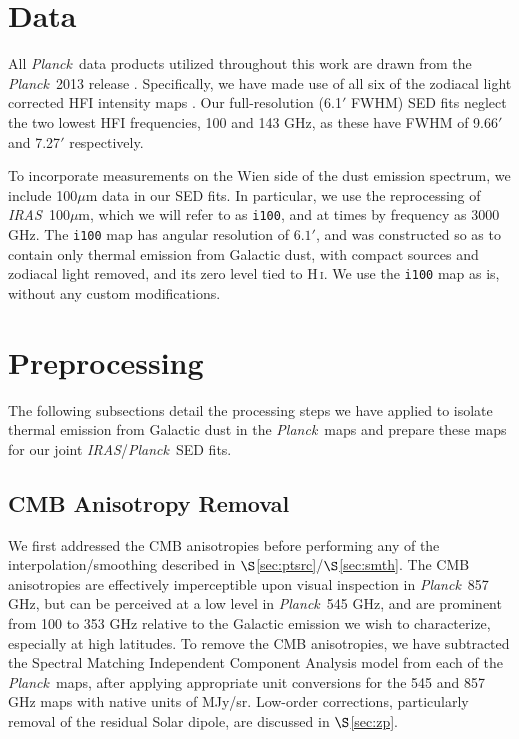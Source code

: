 \documentclass{emulateapj}
\newcommand{\IRAS}{{\it IRAS}}
\newcommand{\PLANCK}{{\it Planck}}
\begin{document}
\section{Data}
\label{sec:data}
All \PLANCK~data products utilized throughout this work are drawn from the 
\PLANCK~2013 release \citep{planck2013}. Specifically, we have made use 
of all six of the zodiacal light corrected HFI intensity maps
\citep[\texttt{R1.10\_nominal\_ZodiCorrected},][]{planckzodi}. Our 
full-resolution (6.1$'$ FWHM) SED fits neglect the two lowest HFI frequencies, 
100 and 143 GHz, as these have FWHM of 9.66$'$ and 7.27$'$ respectively.

To incorporate measurements on the Wien side of the dust emission spectrum, 
we include 100$\mu$m data in our SED fits. In particular, we use the 
\citet[henceforth SFD]{SFD} reprocessing of \IRAS~100$\mu$m, which we will 
refer to as \verb|i100|, and at times by frequency as 3000 GHz. The \verb|i100|
 map has angular resolution of $6.1'$, and was constructed so as to contain 
only thermal emission from Galactic dust, with compact sources and zodiacal 
light removed, and its zero level tied to H\,\textsc{i}. We use the \verb|i100|
map as is, without any custom modifications.


\section{Preprocessing}
\label{sec:prepro}

The following subsections detail the processing steps we have applied to 
isolate thermal emission from Galactic dust in the \PLANCK~maps and prepare
these maps for our joint \IRAS/\PLANCK~SED fits.

\subsection{CMB Anisotropy Removal}
\label{sec:cmb}
We first addressed the CMB anisotropies before performing any of the 
interpolation/smoothing described in $\S$\ref{sec:ptsrc}/$\S$\ref{sec:smth}. 
The CMB anisotropies are effectively imperceptible upon visual inspection 
in \PLANCK~857 GHz, but can be perceived at a low level in \PLANCK~545 GHz, and
are prominent from 100 to 353 GHz relative to the Galactic emission
we wish to characterize, especially at high latitudes. To remove the CMB 
anisotropies, we have subtracted the Spectral Matching Independent Component 
Analysis \citep[SMICA,][]{smica} model from each of the \PLANCK~maps, 
after applying appropriate unit conversions for the 545 and 857 GHz maps 
with native units of MJy/sr. Low-order corrections, particularly removal of the
residual Solar dipole, are discussed in $\S$\ref{sec:zp}.
\end{document}
